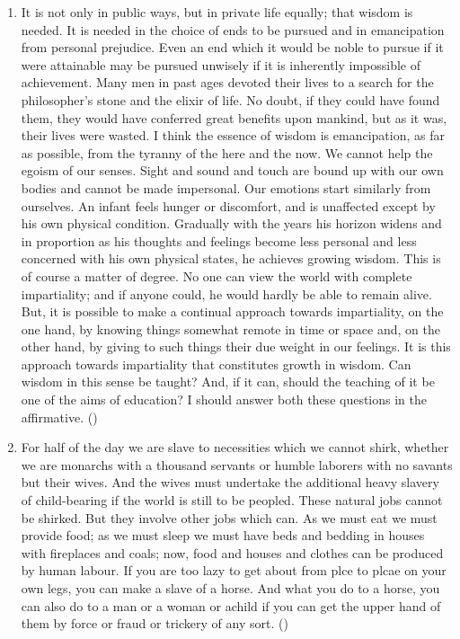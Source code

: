 \documentclass[12pt]{article}
\begin{document}
\begin{enumerate}
    \item It is not only in public ways, but in private life equally; that wisdom is needed. It is needed in the choice of ends to be pursued and in emancipation from personal prejudice. Even an end which it would be noble to pursue if it were attainable may be pursued unwisely if it is inherently impossible of achievement. Many men in past ages devoted their lives to a search for the philosopher's stone and the elixir of life. No doubt, if they could have found them, they would have conferred great benefits upon mankind, but as it was, their lives were wasted. 
      I think the essence of wisdom is emancipation, as far as possible, from the tyranny of the here and the now. We cannot help the egoism of our senses. Sight and sound and touch are bound up with our own bodies and cannot be made impersonal. Our emotions start similarly from ourselves. An infant feels hunger or discomfort, and is unaffected except by his own physical condition. Gradually with the years his horizon widens and in proportion as his thoughts and feelings become less personal and less concerned with his own physical states, he achieves growing wisdom. This is of course a matter of degree. No one can view the world with complete impartiality; and if anyone could, he would hardly be able to remain alive. But, it is possible to make a continual approach towards impartiality, on the one hand, by knowing things somewhat remote in time or space and, on the other hand, by giving to such things their due weight in our feelings. It is this approach towards impartiality that constitutes growth in wisdom.
      Can wisdom in this sense be taught? And, if it can, should the teaching of it be one of the aims of education? I should answer both these questions in the affirmative. \hfill ()

    \item For half of the day we are slave to necessities which we cannot shirk, whether we are monarchs with a thousand servants or humble laborers with no savants but their wives. And the wives must undertake the additional heavy slavery of child-bearing if the world is still to be peopled. These natural jobs cannot be shirked. But they involve other jobs which can. As we must eat we must provide food; as we must sleep we must have beds and bedding in houses with fireplaces and coals; now, food and houses and clothes can be produced by human labour. If you are too lazy to get about from plce to plcae on your own legs, you can make a slave of a horse. And what you do to a horse, you can also do to a man or a woman or  achild if you can get the upper hand of them by force or fraud or trickery of any sort. \hfill ()


\end{enumerate}
\end{document}
